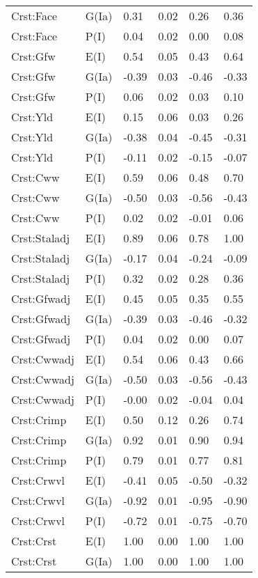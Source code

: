 \begin{center}
\begin{longtable}{|p{1.1in}|p{0.7in}|p{0.7in}|p{0.6in}|p{0.6in}|p{0.6in}|}
  Crst:Face & G(Ia) & 0.31 & 0.02 & 0.26 & 0.36 \\ 
  Crst:Face & P(I) & 0.04 & 0.02 & 0.00 & 0.08 \\ 
  Crst:Gfw & E(I) & 0.54 & 0.05 & 0.43 & 0.64 \\ 
  Crst:Gfw & G(Ia) & -0.39 & 0.03 & -0.46 & -0.33 \\ 
  Crst:Gfw & P(I) & 0.06 & 0.02 & 0.03 & 0.10 \\ 
  Crst:Yld & E(I) & 0.15 & 0.06 & 0.03 & 0.26 \\ 
  Crst:Yld & G(Ia) & -0.38 & 0.04 & -0.45 & -0.31 \\ 
  Crst:Yld & P(I) & -0.11 & 0.02 & -0.15 & -0.07 \\ 
  Crst:Cww & E(I) & 0.59 & 0.06 & 0.48 & 0.70 \\ 
  Crst:Cww & G(Ia) & -0.50 & 0.03 & -0.56 & -0.43 \\ 
  Crst:Cww & P(I) & 0.02 & 0.02 & -0.01 & 0.06 \\ 
  Crst:Staladj & E(I) & 0.89 & 0.06 & 0.78 & 1.00 \\ 
  Crst:Staladj & G(Ia) & -0.17 & 0.04 & -0.24 & -0.09 \\ 
  Crst:Staladj & P(I) & 0.32 & 0.02 & 0.28 & 0.36 \\ 
  Crst:Gfwadj & E(I) & 0.45 & 0.05 & 0.35 & 0.55 \\ 
  Crst:Gfwadj & G(Ia) & -0.39 & 0.03 & -0.46 & -0.32 \\ 
  Crst:Gfwadj & P(I) & 0.04 & 0.02 & 0.00 & 0.07 \\ 
  Crst:Cwwadj & E(I) & 0.54 & 0.06 & 0.43 & 0.66 \\ 
  Crst:Cwwadj & G(Ia) & -0.50 & 0.03 & -0.56 & -0.43 \\ 
  Crst:Cwwadj & P(I) & -0.00 & 0.02 & -0.04 & 0.04 \\ 
  Crst:Crimp & E(I) & 0.50 & 0.12 & 0.26 & 0.74 \\ 
  Crst:Crimp & G(Ia) & 0.92 & 0.01 & 0.90 & 0.94 \\ 
  Crst:Crimp & P(I) & 0.79 & 0.01 & 0.77 & 0.81 \\ 
  Crst:Crwvl & E(I) & -0.41 & 0.05 & -0.50 & -0.32 \\ 
  Crst:Crwvl & G(Ia) & -0.92 & 0.01 & -0.95 & -0.90 \\ 
  Crst:Crwvl & P(I) & -0.72 & 0.01 & -0.75 & -0.70 \\ 
  Crst:Crst & E(I) & 1.00 & 0.00 & 1.00 & 1.00 \\ 
  Crst:Crst & G(Ia) & 1.00 & 0.00 & 1.00 & 1.00 \\ 

\end{longtable}
\end{center}
